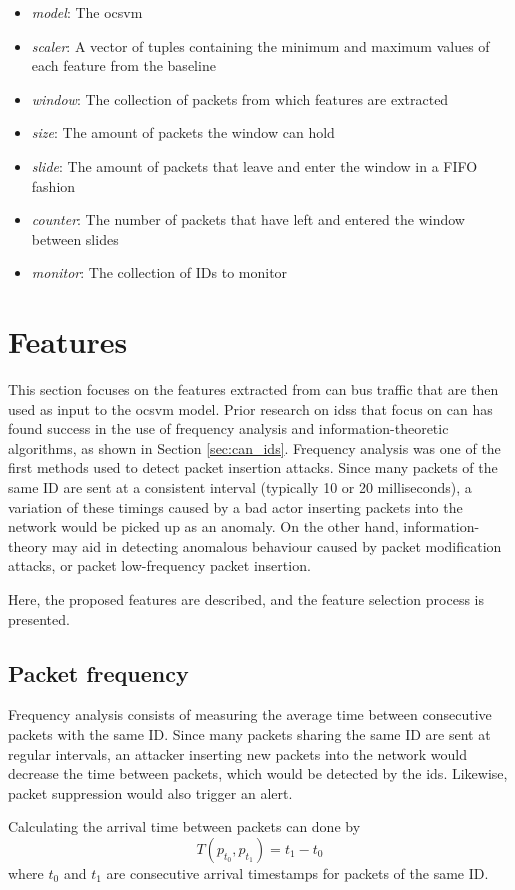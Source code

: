 \begin{itemize}
    \item \textit{model}: The \gls{ocsvm}
    \item \textit{scaler}: A vector of tuples containing the minimum and maximum values of each feature from the baseline
    \item \textit{window}: The collection of packets from which features are extracted
    \item \textit{size}: The amount of packets the window can hold
    \item \textit{slide}: The amount of packets that leave and enter the window in a FIFO fashion
    \item \textit{counter}: The number of packets that have left and entered the window between slides
    \item \textit{monitor}: The collection of IDs to monitor
\end{itemize}

\section{Features}

This section focuses on the features extracted from \gls{can} bus traffic that are then used as input to the \gls{ocsvm} model. Prior research on \glspl{ids} that focus on \gls{can} has found success in the use of frequency analysis and information-theoretic algorithms, as shown in Section \ref{sec:can_ids}. Frequency analysis was one of the first methods used to detect packet insertion attacks. Since many packets of the same ID are sent at a consistent interval (typically 10 or 20 milliseconds), a variation of these timings caused by a bad actor inserting packets into the network would be picked up as an anomaly. On the other hand, information-theory may aid in detecting anomalous behaviour caused by packet modification attacks, or packet low-frequency packet insertion.\par
Here, the proposed features are described, and the feature selection process is presented.

\subsection{Packet frequency}

Frequency analysis consists of measuring the average time between consecutive packets with the same ID. Since many packets sharing the same ID are sent at regular intervals, an attacker inserting new packets into the network would decrease the time between packets, which would be detected by the \gls{ids}. Likewise, packet suppression would also trigger an alert.\par
Calculating the arrival time between packets can done by \[T(p_{t_0}, p_{t_1}) = t_1 - t_0\] where $t_0$ and $t_1$ are consecutive arrival timestamps for packets of the same ID.

